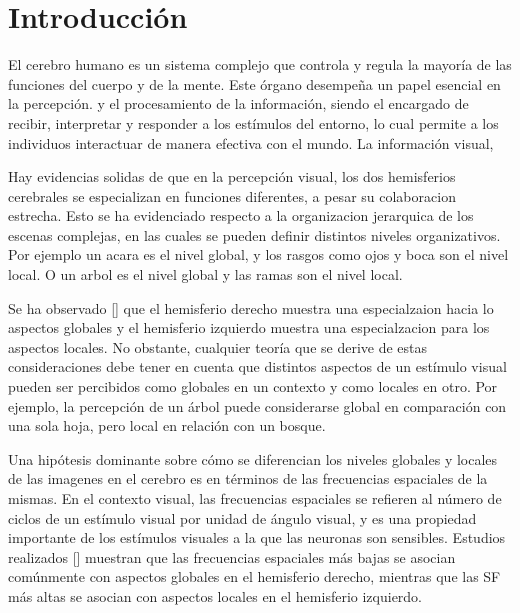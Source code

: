 \chapter*{Introducción}\label{chapter:introduction}

El cerebro humano es un sistema complejo que controla y regula la mayoría de las funciones del cuerpo y de la mente. Este órgano desempeña un papel esencial en la percepción.  y el procesamiento de la información, siendo el encargado de recibir, interpretar y responder a los estímulos del entorno, lo cual permite a los individuos interactuar de manera efectiva con el mundo. La información visual, 

Hay evidencias solidas de que en la percepción visual, los dos hemisferios cerebrales se especializan en funciones diferentes, a pesar su colaboracion estrecha. Esto se ha evidenciado respecto a la organizacion jerarquica de los escenas complejas, en las cuales se pueden definir distintos niveles organizativos.  Por ejemplo un acara es el nivel global, y los rasgos como ojos y boca son el nivel local. O un arbol es el nivel global y las ramas son el nivel local.

 Se ha observado [\cite{flevaris_spatial_2016}] que el hemisferio derecho muestra una especialzaion hacia lo aspectos globales  y el hemisferio izquierdo muestra una especialzacion para los aspectos locales. No obstante, cualquier teoría que se derive de estas consideraciones debe tener en cuenta que distintos aspectos de un estímulo visual pueden ser percibidos como globales en un contexto y como locales en otro. Por ejemplo, la percepción de un árbol puede considerarse global en comparación con una sola hoja, pero local en relación con un bosque.

Una hipótesis dominante sobre cómo se diferencian los niveles globales y locales de las imagenes en el  cerebro es en términos de las frecuencias espaciales de la mismas. En el contexto visual, las frecuencias espaciales se refieren al número de ciclos de un estímulo visual por unidad de ángulo visual, y es una propiedad importante de los estímulos visuales a la que las neuronas son sensibles. Estudios realizados [\cite{flevaris_spatial_2016}] muestran que las frecuencias espaciales más bajas se asocian comúnmente con aspectos globales en el hemisferio derecho, mientras que las SF más altas se asocian con aspectos locales en el hemisferio izquierdo. 



